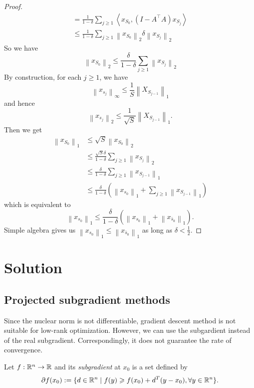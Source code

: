 \documentclass[11pt]{article}
\begin{document}
\begin{proof}
$$\begin{aligned}
& =\frac{1}{1-\delta} \sum_{j \geqslant 1}\left\langle x_{S_{0}},\left(I-A^{\top} A\right) x_{S_{j}}\right\rangle & \\
& \leqslant \frac{1}{1-\delta} \sum_{j \geqslant 1}\left\|x_{S_{0}}\right\|_{2} \delta\left\|x_{S_{j}}\right\|_{2} & 
\end{aligned}
$$
So we have
$$
\left\|x_{S_{0}}\right\|_{2} \leqslant \frac{\delta}{1-\delta} \sum_{j \geqslant 1}\left\|x_{S_{j}}\right\|_{2}
$$
By construction, for each $j \geqslant 1$, we have
$$
\left\|x_{s_{j}}\right\|_{\infty} \leqslant \frac{1}{S}\left\|X_{S_{j-1}}\right\|_{1}
$$
and hence
$$
\left\|x_{s_{j}}\right\|_{2} \leqslant \frac{1}{\sqrt{S}}\left\|X_{S_{j-1}}\right\|_{1} .
$$
Then we get
$$
\begin{aligned}
\left\|x_{S_{0}}\right\|_{1} & \leqslant \sqrt{S}\left\|x_{S_{0}}\right\|_{2} \\
& \leqslant \frac{\sqrt{S} \delta}{1-\delta} \sum_{j \geqslant 1}\left\|x_{S_{j}}\right\|_{2} \\
& \leqslant \frac{\delta}{1-\delta} \sum_{j \geqslant 1}\left\|x_{S_{j-1}}\right\|_{1} \\
& \leqslant \frac{\delta}{1-\delta}\left(\left\|x_{s_{0}}\right\|_{1}+\sum_{j \geqslant 1}\left\|x_{S_{j-1}}\right\|_{1}\right)
\end{aligned}
$$
which is equivalent to
$$
\left\|x_{s_{0}}\right\|_{1} \leqslant \frac{\delta}{1-\delta}\left(\left\|x_{s_{0}}\right\|_{1}+\left\|x_{\bar{s}_{0}}\right\|_{1}\right) .
$$
Simple algebra gives us $\left\|x_{s_{0}}\right\|_{1} \leqslant\left\|x_{\bar{s}_{0}}\right\|_{1}$ as long as $\delta<\frac{1}{2}$.
\end{proof}


\section{Solution}

\subsection{Projected subgradient methods}

Since the nuclear norm is not differentiable, gradient descent method is not suitable for low-rank optimization. However, we can use the subgardient instead of the real subgradient. Correspondingly, it does not guarantee the rate of convergence.

\begin{definition}
    Let \(f:\mathbb R^n \to \mathbb R\) and its \emph{subgradient} at \(x_0\) is a set defined by
    \[\partial f(x_0) := \{d \in \mathbb R^n \mid f(y)\geqslant f(x_0) + d^T (y-x_0),\forall y \in \mathbb R^n\}.\]
\end{definition}
\end{document}
